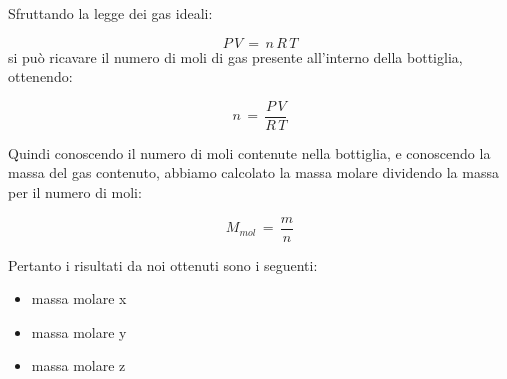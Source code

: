 Sfruttando la legge dei gas ideali:

\begin{equation}
	P\,V \,=\, n\,R\,T
\end{equation}
%
si può ricavare il numero di moli di gas presente all'interno della bottiglia, ottenendo:

\begin{equation}
	n \,=\, \frac{P\,V}{R\,T}
\end{equation}

Quindi conoscendo il numero di moli contenute nella bottiglia, e conoscendo la massa del gas contenuto,
abbiamo calcolato la massa molare dividendo la massa per il numero di moli:

\begin{equation}
	M_{mol} \,=\, \frac{m}{n}
\end{equation}

Pertanto i risultati da noi ottenuti sono i seguenti:

\begin{itemize}
	\item{massa molare x}
	\item{massa molare y}
	\item{massa molare z}
\end{itemize}

